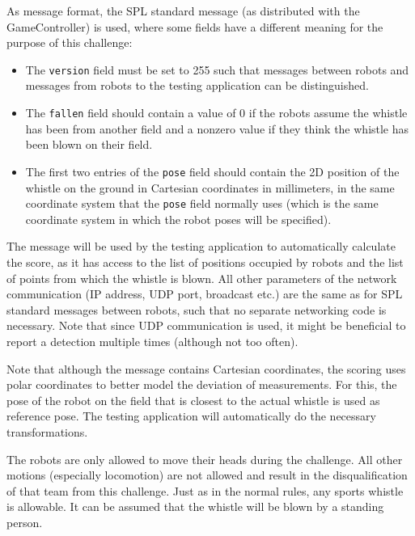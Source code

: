 \documentclass[12pt]{article}
\begin{document}
As message format, the SPL standard message (as distributed with the GameController) is used, where some fields have a different meaning for the purpose of this challenge:
\begin{itemize}
\item The \texttt{version} field must be set to 255 such that messages between robots and messages from robots to the testing application can be distinguished.
\item The \texttt{fallen} field should contain a value of 0 if the robots assume the whistle has been from another field and a nonzero value if they think the whistle has been blown on their field.
\item The first two entries of the \texttt{pose} field should contain the 2D position of the whistle on the ground in Cartesian coordinates in millimeters, in the same coordinate system that the \texttt{pose} field normally uses (which is the same coordinate system in which the robot poses will be specified).
\end{itemize}
The message will be used by the testing application to automatically calculate the score, as it has access to the list of positions occupied by robots and the list of points from which the whistle is blown. All other parameters of the network communication (IP address, UDP port, broadcast etc.) are the same as for SPL standard messages between robots, such that no separate networking code is necessary. Note that since UDP communication is used, it might be beneficial to report a detection multiple times (although not too often).

Note that although the message contains Cartesian coordinates, the scoring uses polar coordinates to better model the deviation of measurements. For this, the pose of the robot on the field that is closest to the actual whistle is used as reference pose. The testing application will automatically do the necessary transformations.

The robots are only allowed to move their heads during the challenge. All other motions (especially locomotion) are not allowed and result in the disqualification of that team from this challenge. Just as in the normal rules, any sports whistle is allowable. It can be assumed that the whistle will be blown by a standing person.
\end{document}
